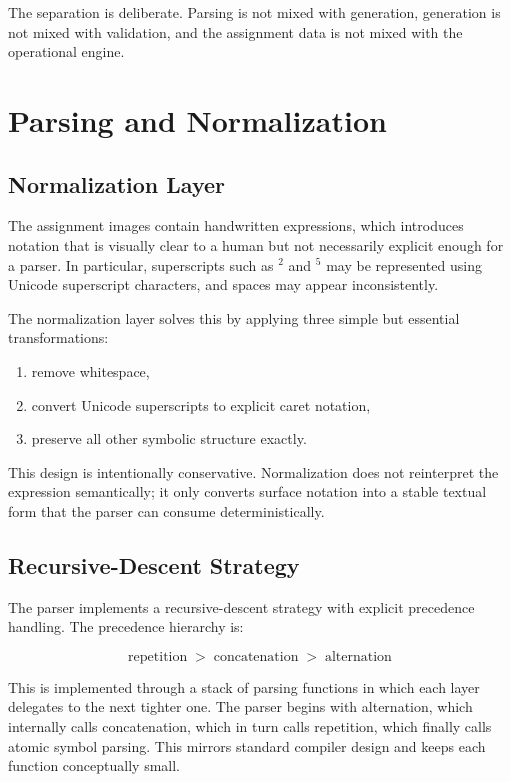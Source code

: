 \documentclass[a4paper,12pt]{article}
\begin{document}
The separation is deliberate. Parsing is not mixed with generation, generation is not mixed with validation, and the assignment data is not mixed with the operational engine.

\section{Parsing and Normalization}

\subsection{Normalization Layer}

The assignment images contain handwritten expressions, which introduces notation that is visually clear to a human but not necessarily explicit enough for a parser. In particular, superscripts such as $^2$ and $^5$ may be represented using Unicode superscript characters, and spaces may appear inconsistently.

The normalization layer solves this by applying three simple but essential transformations:

\begin{enumerate}[label=\arabic*.]
    \item remove whitespace,
    \item convert Unicode superscripts to explicit caret notation,
    \item preserve all other symbolic structure exactly.
\end{enumerate}

This design is intentionally conservative. Normalization does not reinterpret the expression semantically; it only converts surface notation into a stable textual form that the parser can consume deterministically.

\subsection{Recursive-Descent Strategy}

The parser implements a recursive-descent strategy with explicit precedence handling. The precedence hierarchy is:

\[
\text{repetition} \;>\; \text{concatenation} \;>\; \text{alternation}
\]

This is implemented through a stack of parsing functions in which each layer delegates to the next tighter one. The parser begins with alternation, which internally calls concatenation, which in turn calls repetition, which finally calls atomic symbol parsing. This mirrors standard compiler design and keeps each function conceptually small.
\end{document}
